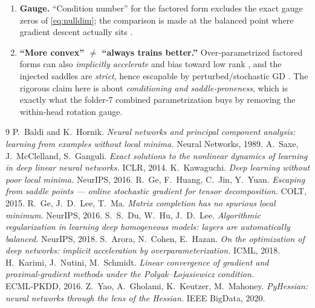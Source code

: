 \documentclass[11pt]{article}
\theoremstyle{remark}
\begin{document}
\begin{enumerate}
\item \textbf{Gauge.} ``Condition number'' for the factored form excludes the
exact gauge zeros of \eqref{eq:nulldim}; the comparison is made at the balanced
point where gradient descent actually sits \cite{DuHuLee2018}.
\item \textbf{``More convex'' $\neq$ ``always trains better.''} Over‑parametrized
factored forms can also \emph{implicitly accelerate} and bias toward low rank
\cite{AroraCohenHazan2018}, and the injected saddles are \emph{strict}, hence
escapable by perturbed/stochastic GD \cite{GeHuangJinYuan2015}. The rigorous claim
here is about \emph{conditioning and saddle‑proneness}, which is exactly what the
folder‑7 combined parametrization buys by removing the within‑head rotation gauge.
\end{enumerate}

\begin{thebibliography}{9}
 P.~Baldi and K.~Hornik.
\emph{Neural networks and principal component analysis: learning from examples
without local minima.} Neural Networks, 1989.
 A.~Saxe, J.~McClelland, S.~Ganguli.
\emph{Exact solutions to the nonlinear dynamics of learning in deep linear neural
networks.} ICLR, 2014.
 K.~Kawaguchi.
\emph{Deep learning without poor local minima.} NeurIPS, 2016.
 R.~Ge, F.~Huang, C.~Jin, Y.~Yuan.
\emph{Escaping from saddle points --- online stochastic gradient for tensor
decomposition.} COLT, 2015.
 R.~Ge, J.~D.~Lee, T.~Ma.
\emph{Matrix completion has no spurious local minimum.} NeurIPS, 2016.
 S.~S.~Du, W.~Hu, J.~D.~Lee.
\emph{Algorithmic regularization in learning deep homogeneous models: layers are
automatically balanced.} NeurIPS, 2018.
 S.~Arora, N.~Cohen, E.~Hazan.
\emph{On the optimization of deep networks: implicit acceleration by
overparameterization.} ICML, 2018.
 H.~Karimi, J.~Nutini, M.~Schmidt.
\emph{Linear convergence of gradient and proximal‑gradient methods under the
Polyak--{\L}ojasiewicz condition.} ECML‑PKDD, 2016.
 Z.~Yao, A.~Gholami, K.~Keutzer, M.~Mahoney.
\emph{PyHessian: neural networks through the lens of the Hessian.} IEEE BigData,
2020.
\end{thebibliography}
\end{document}

